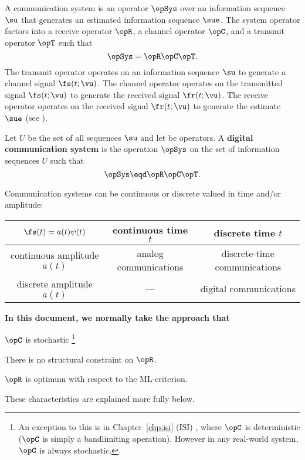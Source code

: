 A communication system is an operator $\opSys$ over an 
information sequence $\su$ that generates an
estimated information sequence $\sue$.
The system operator factors into a
receive operator $\opR$, a channel operator $\opC$, and
a transmit operator $\opT$ such that
   \[ \opSys = \opR\opC\opT. \]
The transmit operator
operates on an information sequence $\su$ to generate
a channel signal $\fs(t;\vu)$.
The channel operator operates on the transmitted signal $\fs(t;\vu)$
to generate the received signal $\fr(t;\vu)$.
The receive operator operates on the received signal $\fr(t;\vu)$
to generate the estimate $\sue$
(see ).


\begin{definition}
\label{def:comsys}
Let $U$ be the set of all sequences $\su$ and let
be operators.
A {\bf digital communication system} is the operation $\opSys$
on the set of information sequences $U$ such that
\[ \opSys \eqd \opR\opC\opT.\]
\end{definition}

Communication systems can be continuous or discrete valued in
time and/or amplitude:

\begin{center}
   \begin{tabular}{|c||c|c|}
      \hline
         $\fs(t)=a(t)\psi(t)$   &  continuous time $t$      & discrete time $t$   \\
      \hline
      \hline
         continuous amplitude $a(t)$ & analog communications   & discrete-time communications  \\
      \hline
         discrete amplitude $a(t)$   & ---                     & digital communications \\
      \hline
   \end{tabular}
\end{center}

{\bf In this document, we normally take the approach that}
\begin{enume}
   \item $\opC$ is stochastic
         \footnote{
         An exception to this is
         in Chapter~\ref{chp:isi} (ISI) ,
         where $\opC$ is deterministic
         ($\opC$ is simply a bandlimiting operation).
         However in any real-world system, $\opC$ is always stochastic.
         }
   \item There is no structural constraint on $\opR$.
   \item $\opR$ is optimum with respect to the ML-criterion.
\end{enume}
These characteristics are explained more fully below.

